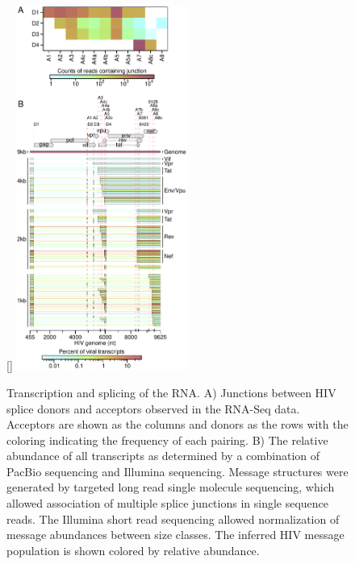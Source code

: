 \documentclass[../sherrill-Mix_thesis.tex]{subfiles}
\begin{document}
		\begin{figure}
			\centering
				[\FBwidth]{
					\includegraphics[width=0.5\textwidth]{comboHiv.pdf}
				}{
					\caption[Transcription and splicing of the \hivEight{} RNA]{Transcription and splicing of the \hivEight{} RNA. A) Junctions between HIV splice donors and acceptors observed in the RNA-Seq data. Acceptors are shown as the columns and donors as the rows with the coloring indicating the frequency of each pairing.   B) The relative abundance of all \hivEight{} transcripts as determined by a combination of PacBio sequencing \citep{Ocwieja2012} and Illumina sequencing. Message structures were generated by targeted long read single molecule sequencing, which allowed association of multiple splice junctions in single sequence reads. The Illumina short read sequencing allowed normalization of message abundances between size classes. The inferred HIV message population is shown colored by relative abundance.} 
					\label{figHiv}
				}
		\end{figure}
\end{document}
